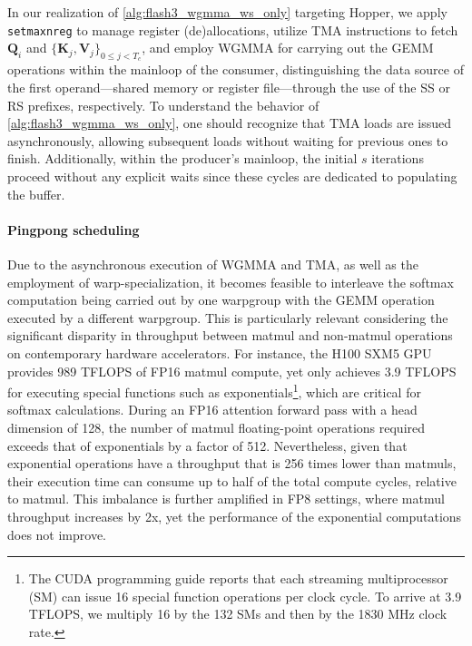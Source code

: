 In our realization of \cref{alg:flash3_wgmma_ws_only} targeting Hopper, we apply \verb|setmaxnreg| to manage register (de)allocations, utilize TMA instructions to fetch $\mathbf{Q}_i$ and $\{\mathbf{K}_j, \mathbf{V}_j\}_{0 \leq j < T_c}$, and employ WGMMA for carrying out the GEMM operations within the mainloop of the consumer, distinguishing the data source of the first operand—shared memory or register file—through the use of the SS or RS prefixes, respectively. To understand the behavior of \cref{alg:flash3_wgmma_ws_only}, one should recognize that TMA loads are issued asynchronously, allowing subsequent loads without waiting for previous ones to finish. Additionally, within the producer’s mainloop, the initial $s$ iterations proceed without any explicit waits since these cycles are dedicated to populating the buffer.

\paragraph{Pingpong scheduling} Due to the asynchronous execution of WGMMA and TMA, as well as the employment of warp-specialization, it becomes feasible to interleave the softmax computation being carried out by one warpgroup with the GEMM operation executed by a different warpgroup. This is particularly relevant considering the significant disparity in throughput between matmul and non-matmul operations on contemporary hardware accelerators. For instance, the H100 SXM5 GPU provides 989 TFLOPS of FP16 matmul compute, yet only achieves 3.9 TFLOPS for executing special functions such as exponentials\footnote{The CUDA programming guide reports that each streaming multiprocessor (SM) can issue 16 special function operations per clock cycle. To arrive at 3.9 TFLOPS, we multiply 16 by the 132 SMs and then by the 1830 MHz clock rate.}, which are critical for softmax calculations. During an FP16 attention forward pass with a head dimension of 128, the number of matmul floating-point operations required exceeds that of exponentials by a factor of 512. Nevertheless, given that exponential operations have a throughput that is 256 times lower than matmuls, their execution time can consume up to half of the total compute cycles, relative to matmul. This imbalance is further amplified in FP8 settings, where matmul throughput increases by 2x, yet the performance of the exponential computations does not improve.


